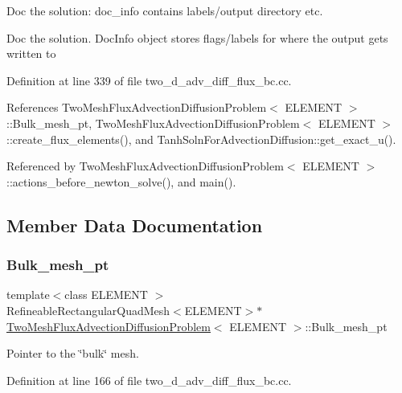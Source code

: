Doc the solution\+: doc\+\_\+info contains labels/output directory etc. 

Doc the solution. Doc\+Info object stores flags/labels for where the output gets written to 

Definition at line 339 of file two\+\_\+d\+\_\+adv\+\_\+diff\+\_\+flux\+\_\+bc.\+cc.



References Two\+Mesh\+Flux\+Advection\+Diffusion\+Problem$<$ E\+L\+E\+M\+E\+N\+T $>$\+::\+Bulk\+\_\+mesh\+\_\+pt, Two\+Mesh\+Flux\+Advection\+Diffusion\+Problem$<$ E\+L\+E\+M\+E\+N\+T $>$\+::create\+\_\+flux\+\_\+elements(), and Tanh\+Soln\+For\+Advection\+Diffusion\+::get\+\_\+exact\+\_\+u().



Referenced by Two\+Mesh\+Flux\+Advection\+Diffusion\+Problem$<$ E\+L\+E\+M\+E\+N\+T $>$\+::actions\+\_\+before\+\_\+newton\+\_\+solve(), and main().



\subsection{Member Data Documentation}
\mbox{\label{classTwoMeshFluxAdvectionDiffusionProblem_ad022fed8fda1294ac4e86b893f32d63c}} 
\subsubsection{\texorpdfstring{Bulk\+\_\+mesh\+\_\+pt}{Bulk\_mesh\_pt}}
{\footnotesize\ttfamily template$<$class E\+L\+E\+M\+E\+NT $>$ \\
Refineable\+Rectangular\+Quad\+Mesh$<$E\+L\+E\+M\+E\+NT$>$$\ast$ \hyperlink{classTwoMeshFluxAdvectionDiffusionProblem}{Two\+Mesh\+Flux\+Advection\+Diffusion\+Problem}$<$ E\+L\+E\+M\+E\+NT $>$\+::Bulk\+\_\+mesh\+\_\+pt\hspace{0.3cm}{\ttfamily [private]}}



Pointer to the \char`\"{}bulk\char`\"{} mesh. 



Definition at line 166 of file two\+\_\+d\+\_\+adv\+\_\+diff\+\_\+flux\+\_\+bc.\+cc.



